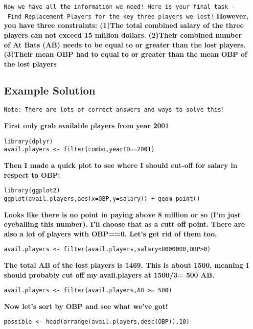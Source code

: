 \documentclass[
]{article}
\begin{document}
\texttt{Now\ we\ have\ all\ the\ information\ we\ need!\ Here\ is\ your\ final\ task\ -\ Find\ Replacement\ Players\ for\ the\ key\ three\ players\ we\ lost!}
\textbf{However, you have three constraints: (1)The total combined
salary of the three players can not exceed 15 million dollars.}
\textbf{(2)Their combined number of At Bats (AB) needs to be equal to or
greater than the lost players.} \textbf{(3)Their mean OBP had to equal
to or greater than the mean OBP of the lost players}

\hypertarget{example-solution}{%
\subsection{Example Solution}\label{example-solution}}

\texttt{Note:\ There\ are\ lots\ of\ correct\ answers\ and\ ways\ to\ solve\ this!}

\textbf{First only grab available players from year 2001}

\begin{verbatim}
library(dplyr)
avail.players <- filter(combo,yearID==2001)
\end{verbatim}

\textbf{Then I made a quick plot to see where I should cut-off for
salary in respect to OBP:}

\begin{verbatim}
library(ggplot2)
ggplot(avail.players,aes(x=OBP,y=salary)) + geom_point()
\end{verbatim}

\textbf{Looks like there is no point in paying above 8 million or so
(I'm just eyeballing this number). I'll choose that as a cutt off point.
There are also a lot of players with OBP==0. Let's get rid of them too.}

\begin{verbatim}
avail.players <- filter(avail.players,salary<8000000,OBP>0)
\end{verbatim}

\textbf{The total AB of the lost players is 1469. This is about 1500,
meaning I should probably cut off my avail.players at 1500/3= 500 AB.}

\begin{verbatim}
avail.players <- filter(avail.players,AB >= 500)
\end{verbatim}

\textbf{Now let's sort by OBP and see what we've got!}

\begin{verbatim}
possible <- head(arrange(avail.players,desc(OBP)),10)
\end{verbatim}
\end{document}
